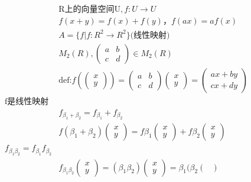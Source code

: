 \documentclass[12pt, a4paper]{article}  %
\begin{document}
\begin{align}
    &\text{R上的向量空间U},f:U\rightarrow U\\
    &f(x+y)=f(x)+f(y)，f(ax)=af(x)\\
    &A=\{f|f:R^2\rightarrow R^2\}\text{(线性映射)}\\
    &M_2(R),\begin{pmatrix}
        a&b\\
        c&d
    \end{pmatrix}\in M_2(R)\\
    &\text{def:} f(\begin{pmatrix}
        x\\
        y
    \end{pmatrix})=\begin{pmatrix}
        a&b\\
        c&d
    \end{pmatrix}\begin{pmatrix}
        x\\
        y
    \end{pmatrix}=\begin{pmatrix}
        ax+by\\
        cx+dy
    \end{pmatrix}\\
    \text{f是线性映射}\\
    &f_{\beta_1+\beta_2}=f_{\beta_1}+f_{\beta_2}\\
    &f(\beta_1+\beta_2)\begin{pmatrix}
        x\\
        y
    \end{pmatrix}=f\beta_1\begin{pmatrix}
        x\\
        y
    \end{pmatrix}+f\beta_2\begin{pmatrix}
        x\\
        y
    \end{pmatrix}\\
    f_{\beta_1 \beta_2}=f_{\beta_1}f_{\beta_2}\\
    &f_{\beta_1 \beta_2} \begin{pmatrix}
        x\\
        y
    \end{pmatrix}=(\beta_1 \beta_2)\begin{pmatrix}
        x\\
        y
    \end{pmatrix}=\beta_1(\beta_2\begin{pmatrix}

\end{pmatrix}
\end{align}
\end{document}
